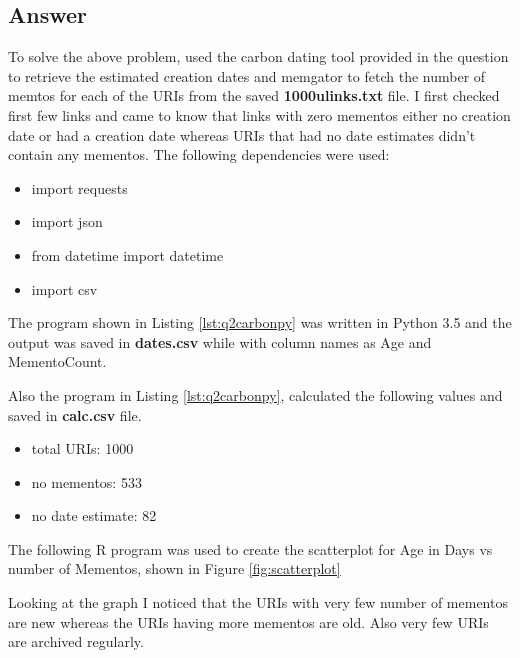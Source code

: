 \documentclass[letterpaper,11pt]{article}
\begin{document}
\subsection*{Answer}
To solve the above problem, used the carbon dating tool \cite{carbondateref} provided in the question to retrieve the estimated creation dates and memgator to fetch the number of memtos for each of the URIs from the saved \textbf{1000ulinks.txt} file. I first checked first few links and came to know that links with zero mementos either no creation date or had a creation date whereas URIs that had no date estimates didn't contain any mementos. 
The following dependencies were used:
\begin{itemize}
  \item import requests
  \item import json
  \item from datetime import datetime
  \item import csv
  
\end{itemize}  

The program shown in Listing \ref{lst:q2carbonpy} was written in Python 3.5 and the output was saved in \textbf{dates.csv} while with column names as Age and MementoCount.


\clearpage
Also the program in Listing \ref{lst:q2carbonpy}, calculated the following values and saved in \textbf{calc.csv} file.
\begin{itemize}
  \item total URIs:	     1000
  \item no mementos:      533
  \item no date estimate: 82
\end{itemize}

The following R \cite{scatref} program was used to create the scatterplot  for Age in Days vs number of Mementos, shown in Figure \ref{fig:scatterplot}



Looking at the graph I noticed that the URIs with very few number of mementos are new whereas the URIs having more mementos are old. Also very few URIs are archived regularly.
\end{document}
